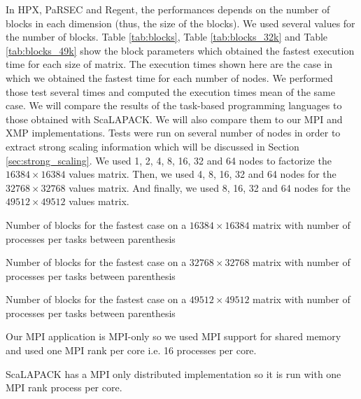 In HPX, PaRSEC and Regent, the performances depends on the number of blocks in each dimension (thus, the size of the blocks).
We used several values for the number of blocks.
Table \ref{tab:blocks}, Table \ref{tab:blocks_32k} and Table \ref{tab:blocks_49k} show the block parameters which obtained the fastest execution time for each size of matrix.
The execution times shown here are the case in which we obtained the fastest time for each number of nodes.
We performed those test several times and computed the execution times mean of the same case.
We will compare the results of the task-based programming languages to those obtained with ScaLAPACK.
We will also compare them to our MPI and XMP implementations.
Tests were run on several number of nodes in order to extract strong scaling information which will be discussed in Section \ref{sec:strong_scaling}.
We used  1, 2, 4, 8, 16, 32 and 64 nodes to factorize the $16384 \times 16384$ values matrix.
Then, we used 4, 8, 16, 32 and 64 nodes for the $32768 \times 32768$ values matrix.
And finally, we used 8, 16, 32 and 64 nodes for the $49512 \times 49512$ values matrix.

\begin{table}[h]
	\centering
	\caption{Number of blocks for the fastest case on a $16384 \times 16384$ matrix with number of processes per tasks between parenthesis\label{tab:blocks}}
	
\end{table}

\begin{table}[h]
	\centering
	\caption{Number of blocks for the fastest case on a $32768 \times 32768$ matrix with number of processes per tasks between parenthesis\label{tab:blocks_32k}}
	
\end{table}

\begin{table}[h]
	\centering
	\caption{Number of blocks for the fastest case on a $49512 \times 49512$ matrix with number of processes per tasks between parenthesis\label{tab:blocks_49k}}
	
\end{table}

Our MPI application is MPI-only so we used MPI support for shared memory and used one MPI rank per core i.e. 16 processes per core.

ScaLAPACK has a MPI only distributed implementation so it is run with one MPI rank process per core.

